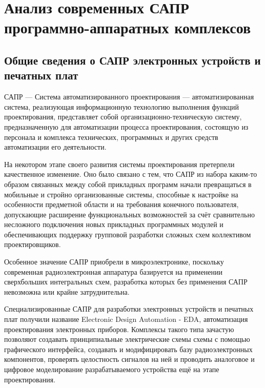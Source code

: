\section{Анализ современных САПР программно\--аппаратных комплексов}

\subsection{Общие сведения о САПР электронных устройств и печатных плат}
\begin{par}
САПР --- Система автоматизированного проектирования --- автоматизированная система, реализующая
информационную технологию выполнения функций проектирования, представляет собой
организационно-техническую систему, предназначенную для автоматизации процесса проектирования,
состоящую из персонала и комплекса технических, программных и других средств
автоматизации его деятельности.
\end{par}

\begin{par}
На некотором этапе своего развития системы проектирования претерпели качественное изменение.
Оно было связано с тем, что САПР из набора каким-то образом связанных между собой прикладных
программ начали превращаться в мобильные и стройно организованные системы, способные к
настройке на особенности предметной области и на требования конечного пользователя,
допускающие расширение функциональных возможностей за счёт сравнительно несложного подключения
новых прикладных программных модулей и обеспечивающих поддержку групповой разработки сложных схем
коллективом проектировщиков.
\end{par}

\begin{par}
Особенное значение САПР приобрели в микроэлектронике, поскольку современная радиоэлектронная аппаратура базируется на применении сверхбольших
интегральных схем, разработка которых без применения САПР невозможна или крайне затруднительна.
\end{par}

\begin{par}
Специализированные САПР для разработки электронных устройств и печатных плат получили название
Electronic Design Automation - EDA, автоматизация проектирования электронных приборов.
Комплексы такого типа зачастую позволяют создавать принципиальные электрические схемы схемы с
помощью графического интерфейса, создавать и модифицировать  базу радиоэлектронных компонентов,
проверять целостность сигналов на ней и проводить аналоговое и цифровое моделирование
разрабатываемого устройства ещё на этапе проектирования.
\end{par}


